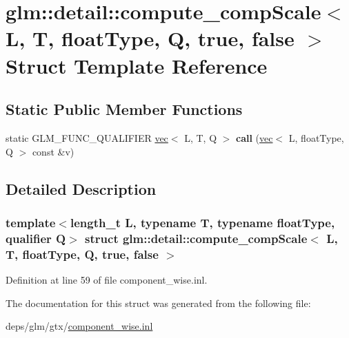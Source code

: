 \hypertarget{structglm_1_1detail_1_1compute__compScale_3_01L_00_01T_00_01floatType_00_01Q_00_01true_00_01false_01_4}{}\section{glm\+:\+:detail\+:\+:compute\+\_\+comp\+Scale$<$ L, T, float\+Type, Q, true, false $>$ Struct Template Reference}
\label{structglm_1_1detail_1_1compute__compScale_3_01L_00_01T_00_01floatType_00_01Q_00_01true_00_01false_01_4}
\subsection*{Static Public Member Functions}
\begin{DoxyCompactItemize}
\item 
\mbox{\label{structglm_1_1detail_1_1compute__compScale_3_01L_00_01T_00_01floatType_00_01Q_00_01true_00_01false_01_4_a6f43175330a561e484c39041fd204fb4}} 
static G\+L\+M\+\_\+\+F\+U\+N\+C\+\_\+\+Q\+U\+A\+L\+I\+F\+I\+ER \hyperlink{structglm_1_1vec}{vec}$<$ L, T, Q $>$ {\bfseries call} (\hyperlink{structglm_1_1vec}{vec}$<$ L, float\+Type, Q $>$ const \&v)
\end{DoxyCompactItemize}


\subsection{Detailed Description}
\subsubsection*{template$<$length\+\_\+t L, typename T, typename float\+Type, qualifier Q$>$\newline
struct glm\+::detail\+::compute\+\_\+comp\+Scale$<$ L, T, float\+Type, Q, true, false $>$}



Definition at line 59 of file component\+\_\+wise.\+inl.



The documentation for this struct was generated from the following file\+:\begin{DoxyCompactItemize}
\item 
deps/glm/gtx/\hyperlink{component__wise_8inl}{component\+\_\+wise.\+inl}\end{DoxyCompactItemize}
